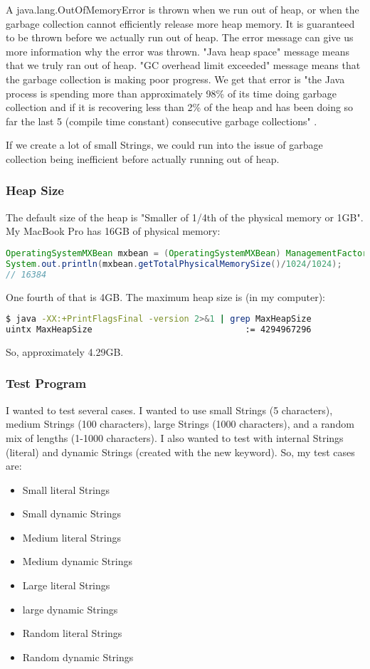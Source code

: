 A java.lang.OutOfMemoryError is thrown when we run out of heap, or when the garbage collection cannot efficiently release more heap memory. It is guaranteed to be thrown before we actually run out of heap. The error message can give us more information why the error was thrown. "Java heap space" message means that we truly ran out of heap. "GC overhead limit exceeded" message means that the garbage collection is making poor progress. We get that error is "the Java process is spending more than approximately 98\% of its time doing garbage collection and if it is recovering less than 2\% of the heap and has been doing so far the last 5 (compile time constant) consecutive garbage collections" \cite{gosling}.

If we create a lot of small Strings, we could run into the issue of garbage collection being inefficient before actually running out of heap.

\subsubsection{Heap Size}

The default size of the heap is "Smaller of 1/4th of the physical memory or 1GB"\cite{gcergo}. My MacBook Pro has 16GB of physical memory:
\begin{lstlisting}[language=Java]
OperatingSystemMXBean mxbean = (OperatingSystemMXBean) ManagementFactory.getOperatingSystemMXBean();
System.out.println(mxbean.getTotalPhysicalMemorySize()/1024/1024);
// 16384
\end{lstlisting}

One fourth of that is 4GB. The maximum heap size is (in my computer):
\begin{lstlisting}[language=bash]
$ java -XX:+PrintFlagsFinal -version 2>&1 | grep MaxHeapSize
uintx MaxHeapSize                              := 4294967296                          {product}
\end{lstlisting}
So, approximately 4.29GB. 

\subsubsection{Test Program}
I wanted to test several cases. I wanted to use small Strings (5 characters), medium Strings (100 characters), large Strings (1000 characters), and a random mix of lengths (1-1000 characters). I also wanted to test with internal Strings (literal) and dynamic Strings (created with the new keyword). So, my test cases are:
\begin{itemize}
\item Small  literal Strings
\item Small dynamic Strings
\item Medium literal Strings
\item Medium dynamic Strings
\item Large literal Strings
\item large dynamic Strings
\item Random literal Strings
\item Random dynamic Strings
\end{itemize}


